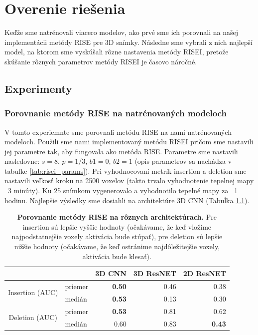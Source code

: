 \chapter{Overenie riešenia}

Keďže sme natrénovali viacero modelov, ako prvé sme ich porovnali na našej implementácii metódy RISE pre 3D snímky.
Následne sme vybrali z nich najlepší model, na ktorom sme vyskúšali rôzne nastavenia metódy RISEI, pretože skúšanie rôznych parametrov metódy RISEI je časovo náročné.

\section{Experimenty}

\subsection{Porovnanie metódy RISE na natrénovaných modeloch \label{sec:experiment_rise_various_architectures}}

V tomto experiemnte sme porovnali metódu RISE na nami natrénovaných modeloch. Použili sme nami implementovaný metódu RISEI pričom sme nastavili jej parametre tak, aby fungovala ako metóda RISE.
Parametre sme nastavili nasledovne: $s = 8$, $p = 1/3$, $b1 = 0$, $b2 = 1$ (opis parametrov sa nachádza v tabuľke \ref{tab:risei_params}). Pri vyhodnocovaní metrík insertion a deletion sme nastavili veľkosť kroku na 2500 voxelov (takto trvalo vyhodnotenie tepelnej mapy ~3 minúty). Ku 25 snímkom vygenerovalo a vyhodnotilo tepelné mapy za ~1 hodinu. Najlepšie výsledky sme dosiahli na architektúre 3D CNN (Tabuĺka \ref{tab:experiment_rise_various_architectures}).

\begin{table}[]
    \centering
    \begin{tabular}{cl|r|r|r|}
        \cline{3-5}
        \multicolumn{1}{l}{} &  & \multicolumn{1}{c|}{3D CNN} & \multicolumn{1}{c|}{3D ResNET} & \multicolumn{1}{c|}{2D ResNET} \\ \hline
        \multicolumn{1}{|c|}{\multirow{2}{*}{Insertion (AUC)}} & priemer & \textbf{0.50} & 0.46 & 0.38 \\ \cline{2-2}
        \multicolumn{1}{|c|}{}                                 & medián  & \textbf{0.53} & 0.13 & 0.30 \\ \cline{1-2}
        \multicolumn{1}{|c|}{\multirow{2}{*}{Deletion (AUC)}}  & priemer & \textbf{0.53} & 0.81 & 0.62 \\ \cline{2-2}
        \multicolumn{1}{|c|}{}                                 & medián  & 0.60 & 0.83 & \textbf{0.43} \\ \hline
    \end{tabular}
    \caption{\textbf{Porovnanie metódy RISE na rôznych architektúrach.} Pre insertion sú lepšie vyššie hodnoty (očakávame, že keď vložíme najpodstatnejšie voxely aktivácia bude stúpať), pre deletion sú lepšie nižšie hodnoty (očakávame, že keď ostránime najdôležitejšie voxely, aktivácia bude klesať).}
    \label{tab:experiment_rise_various_architectures}
\end{table}

